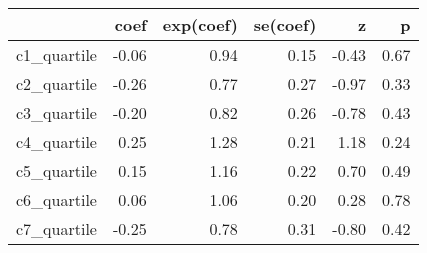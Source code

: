 \documentclass{article}
\begin{document}


\begin{table}[ht]
\centering
\begin{tabular}{rrrrrr}
  \hline
 & coef & exp(coef) & se(coef) & z & p \\
  \hline
c1\_quartile & -0.06 & 0.94 & 0.15 & -0.43 & 0.67 \\
  c2\_quartile & -0.26 & 0.77 & 0.27 & -0.97 & 0.33 \\
  c3\_quartile & -0.20 & 0.82 & 0.26 & -0.78 & 0.43 \\
  c4\_quartile & 0.25 & 1.28 & 0.21 & 1.18 & 0.24 \\
  c5\_quartile & 0.15 & 1.16 & 0.22 & 0.70 & 0.49 \\
  c6\_quartile & 0.06 & 1.06 & 0.20 & 0.28 & 0.78 \\
  c7\_quartile & -0.25 & 0.78 & 0.31 & -0.80 & 0.42 \\
   \hline
\end{tabular}
\end{table}
\end{document}
